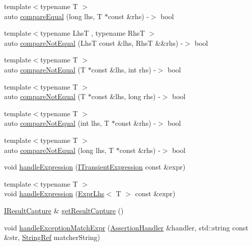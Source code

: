 \begin{DoxyCompactItemize}
\item 
{\footnotesize template$<$typename T $>$ }\\auto \mbox{\hyperlink{namespace_catch_a72f10ec2cad6db16029d48c8c1d9df2f}{compare\+Equal}} (long lhs, T $\ast$const \&rhs) -\/$>$ bool
\item 
{\footnotesize template$<$typename LhsT , typename RhsT $>$ }\\auto \mbox{\hyperlink{namespace_catch_a8bec217f5ef5f09c17074c311c958f3c}{compare\+Not\+Equal}} (LhsT const \&lhs, RhsT \&\&rhs) -\/$>$ bool
\item 
{\footnotesize template$<$typename T $>$ }\\auto \mbox{\hyperlink{namespace_catch_aa81c95898f22dce1f61d7710e495d1ee}{compare\+Not\+Equal}} (T $\ast$const \&lhs, int rhs) -\/$>$ bool
\item 
{\footnotesize template$<$typename T $>$ }\\auto \mbox{\hyperlink{namespace_catch_adad6539b3780b9a8953221efd038e2e4}{compare\+Not\+Equal}} (T $\ast$const \&lhs, long rhs) -\/$>$ bool
\item 
{\footnotesize template$<$typename T $>$ }\\auto \mbox{\hyperlink{namespace_catch_adb4b3e912b89a987025ca28cf0c92ba8}{compare\+Not\+Equal}} (int lhs, T $\ast$const \&rhs) -\/$>$ bool
\item 
{\footnotesize template$<$typename T $>$ }\\auto \mbox{\hyperlink{namespace_catch_a3db634a0adf44a1148767ba149ccf34d}{compare\+Not\+Equal}} (long lhs, T $\ast$const \&rhs) -\/$>$ bool
\item 
void \mbox{\hyperlink{namespace_catch_a65af25091f2ab61056e166765963e525}{handle\+Expression}} (\mbox{\hyperlink{struct_catch_1_1_i_transient_expression}{I\+Transient\+Expression}} const \&expr)
\item 
{\footnotesize template$<$typename T $>$ }\\void \mbox{\hyperlink{namespace_catch_af2c93db76668a981e75ae835699efce7}{handle\+Expression}} (\mbox{\hyperlink{class_catch_1_1_expr_lhs}{Expr\+Lhs}}$<$ T $>$ const \&expr)
\item 
\mbox{\hyperlink{struct_catch_1_1_i_result_capture}{I\+Result\+Capture}} \& \mbox{\hyperlink{namespace_catch_aff60c1de6ac6cea30175d70e33d83c8e}{get\+Result\+Capture}} ()
\item 
void \mbox{\hyperlink{namespace_catch_a53ff6b1a7152359be73802b6f121fef0}{handle\+Exception\+Match\+Expr}} (\mbox{\hyperlink{class_catch_1_1_assertion_handler}{Assertion\+Handler}} \&handler, std\+::string const \&str, \mbox{\hyperlink{class_catch_1_1_string_ref}{String\+Ref}} matcher\+String)

\end{DoxyCompactItemize}
